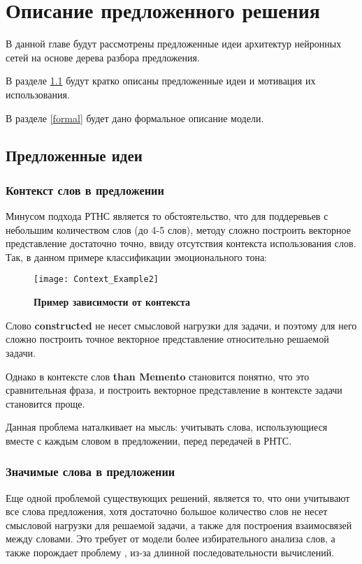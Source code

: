 
\chapter{Описание предложенного решения}

В данной главе будут рассмотрены предложенные идеи архитектур нейронных сетей на основе дерева разбора предложения.

В разделе \ref{ideas} будут кратко описаны предложенные идеи и мотивация их использования.

В разделе \ref{formal} будет дано формальное описание модели.

\section{Предложенные идеи} \label{ideas}

\subsection{Контекст слов в предложении}

Минусом подхода РТНС является то обстоятельство, что для поддеревьев с небольшим количеством слов (до 4-5 слов), методу сложно построить векторное представление достаточно точно, ввиду отсутствия контекста использования слов.\\
Так, в данном примере классификации эмоционального тона:

\begin{figure}[h]
\texttt{[image: Context\_Example2]}
\caption{\textbf{Пример зависимости от контекста}}
\label{fig:context_ex}
\end{figure}
Слово {\selectfont \textbf{constructed}} не несет смысловой нагрузки для задачи, и поэтому для него сложно построить точное векторное представление относительно решаемой задачи.

Однако в контексте слов {\selectfont \textbf{than Memento}} становится понятно, что это сравнительная фраза, и построить векторное представление в контексте задачи становится проще.

Данная проблема наталкивает на мысль: учитывать слова, 
использующиеся вместе с каждым словом в предложении, перед передачей в РНТС.

\subsection{Значимые слова в предложении}
Еще одной проблемой существующих решений, является то,  что они учитывают все слова предложения, 
хотя достаточно большое количество слов не несет смысловой нагрузки для решаемой задачи, а также для построения взаимосвязей
между словами.
Это требует от модели более избирательного анализа слов, а также порождает проблему , из-за 
длинной последовательности вычислений.

